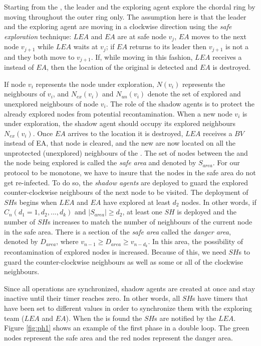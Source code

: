  Starting from the  \hb, the leader and the exploring agent explore    the
 chordal ring by moving throughout the outer  ring  only. The assumption here is that the leader and the exploring agent are moving in a clockwise direction using the {\em safe exploration} technique:  $LEA$ and $EA$ are at safe node $v_{j}$, $EA$ moves to the next node $v_{j+1}$ while $LEA$ waits at $v_{j}$; if $EA$ returns to its leader then $v_{j+1}$ is not a \bv and they both move to $v_{j+1}$. If, while moving in this fashion,  $LEA$ receives a \bv instead of $EA$, then the location of the original \bv is detected and $EA$ is destroyed. 


  If node $v_i$ represents the node under exploration, $N(v_i) $ represents the neighbours of $v_i$, and  $N_{ex}(v_i) $  and $N_{un}(v_i)$ denote the set of explored and unexplored neighbours of node $v_i$. 
  The role of the shadow agents is to protect the already explored nodes from potential recontamination. When a new node $v_i$ is under exploration, the shadow agent should occupy its explored neighbours $N_{ex}(v_i)$.
Once $EA$ arrives to the \bv location it is destroyed, $LEA$ receives a $BV$ instead of EA, that node is cleared, and the new \bvs are now located on  all the unprotected (unexplored) neighbours of the \bv.
The set of nodes between the \hb and the node being explored is called the {\em safe area} and denoted by $S_{area}$. For  our protocol to be monotone, we have to insure that the nodes in the safe area do  not get re-infected. To do so,  the {\em   shadow agents} are deployed to guard the explored counter-clockwise neighbours of the next node to be visited. The deployment of $SH$s begins when $LEA$ and $EA$ have explored at least $d_2$ nodes. In other words, if $C_n( d_1=1, d_{2}, ..., d_{k})$
and $\left\vert{S_{area}}\right\vert \ge d_2$, at least one $SH$ is deployed and the number of $SH$s increases to match the number of neighbours of the current node in the safe area. 
There is a section of the {\em safe area}  called the {\it danger area}, denoted by $D_{area}$, where $v_{n-1}\ge D_{area}\ge v_{n-d_k}$. In this area, the possibility of recontamination of explored nodes is increased. Because of this, we need $SH$s to guard the counter-clockwise neighbours as well as some or all of the clockwise neighbours.

Since all operations are synchronized, shadow agents are created at once and stay inactive until their timer reaches zero. In other words, all $SH$s have timers that have been set to different values in order to synchronize them with the exploring team ($LEA$ and $EA$). 
When the \bv is found the  $SH$s are notified by the $LEA$. 
Figure \ref{fig:ph1} shows an example of the first phase in a double loop. The green nodes represent the safe area and the red nodes represent the danger area.


